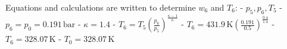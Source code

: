 Equations and calculations are written to determine \( w_6 \) and \( T_6 \):  
- \( p_5, p_6, T_5 \)  
- \( p_6 = p_0 = 0.191 \, \text{bar} \)  
- \( \kappa = 1.4 \)  
- \( T_6 = T_5 \left( \frac{p_6}{p_5} \right)^{\frac{\kappa - 1}{\kappa}} \)  
- \( T_6 = 431.9 \, \text{K} \left( \frac{0.191}{0.5} \right)^{\frac{0.4}{1.4}} \)  
- \( T_6 = 328.07 \, \text{K} \)  
- \( T_0 = 328.07 \, \text{K} \)